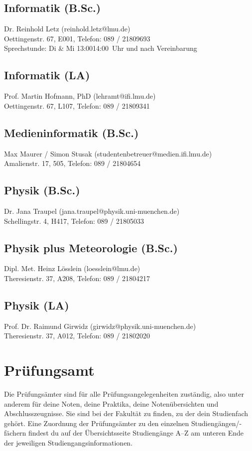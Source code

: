 \subsection*{Informatik (B.Sc.)}
Dr. Reinhold Letz (reinhold.letz@lmu.de)\\
Oettingenstr. 67, E001, Telefon: 089 / 2180\emd{}9693\\
Sprechstunde: Di \& Mi 13:00\emd{}14:00~Uhr und nach Vereinbarung

\subsection*{Informatik (LA)}
Prof. Martin Hofmann, PhD (lehramt@ifi.lmu.de)\\
Oettingenstr. 67, L107, Telefon: 089 / 2180\emd{}9341

\subsection*{Medieninformatik (B.Sc.)}
Max Maurer / Simon Stusak (studentenbetreuer@medien.ifi.lmu.de)\\
Amalienstr. 17, 505, Telefon: 089 / 2180\emd{}4654

\subsection*{Physik (B.Sc.)}
Dr. Jana Traupel (jana.traupel@physik.uni-muenchen.de)\\
Schellingstr. 4, H417, Telefon: 089 / 2180\emd{}5033

\subsection*{Physik plus Meteorologie (B.Sc.)}
Dipl. Met. Heinz Lösslein (loesslein@lmu.de)\\
Theresienstr. 37, A208, Telefon: 089 / 2180\emd{}4217

\subsection*{Physik (LA)}
Prof. Dr. Raimund Girwidz (girwidz@physik.uni-muenchen.de)\\
Theresienstr. 37, A012, Telefon: 089 / 2180\emd{}2020


\section{Prüfungsamt}
Die Prüfungsämter sind für alle Prüfungsangelegenheiten zuständig,
also unter anderem für deine Noten, deine Praktika, deine Notenübersichten und
Abschlusszeugnisse. Sie sind bei der Fakultät zu finden, zu der
dein Studienfach gehört. Eine Zuordnung der Prüfungsämter zu den
einzelnen Studiengängen/-fächern findest du auf der Übersichtsseite
Studiengänge A--Z am unteren Ende der jeweiligen
Studiengangsinformationen.

